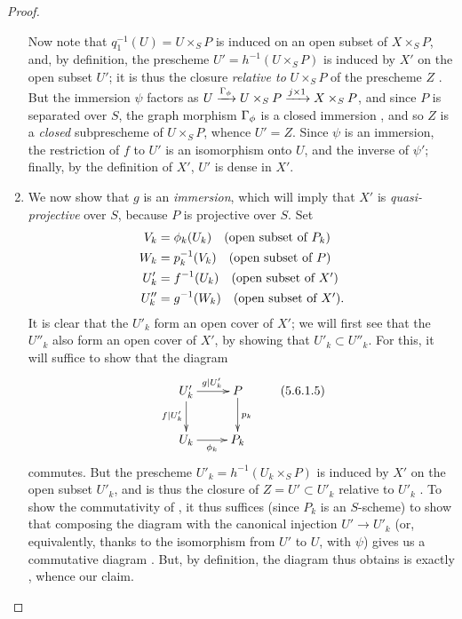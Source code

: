 \begin{proof}
\begin{enumerate}[label=(\Alph*)]
        Now note that $q_1^{-1}(U)=U\times_S P$ is induced on an open subset of $X\times_S P$, and, by definition, the prescheme $U'=h^{-1}(U\times_S P)$ is induced by $X'$ on the open subset $U'$;
        it is thus the closure \emph{relative to}
        $U\times_S P$ of the prescheme $Z$ .
        But the immersion $\psi$ factors as $U\xrightarrow{\Gamma_\phi}U\times_S P\xrightarrow{j\times1}X\times_S P$, and since $P$ is separated over $S$, the graph morphism $\Gamma_\phi$ is a closed immersion , and so $Z$ is a \emph{closed} subprescheme of $U\times_S P$, whence $U'=Z$.
        Since $\psi$ is an immersion, the restriction of $f$ to $U'$ is an isomorphism onto $U$, and the inverse of $\psi'$;
        finally, by the definition of $X'$, $U'$ is dense in $X'$.
    \item We now show that $g$ is an \emph{immersion}, which will imply that $X'$ is \emph{quasi-projective} over $S$, because $P$ is projective over $S$.
        Set
        \begin{align*}
            V_k &= \phi_k(U_k) \quad \mbox{(open subset of $P_k$)}\\
            W_k &= p_k^{-1}(V_k) \quad \mbox{(open subset of $P$)}\\
            U'_k &= f^{-1}(U_k) \quad \mbox{(open subset of $X'$)}\\
            U''_k &= g^{-1}(W_k) \quad \mbox{(open subset of $X'$)}.
        \end{align*}
        It is clear that the $U'_k$ form an open cover of $X'$;
        we will first see that the $U''_k$ also form an open cover of $X'$, by showing that $U'_k\subset U''_k$.
        For this, it will suffice to show that the diagram
        \begin{equation*}
        \label{2.5.6.1.5}
            \xymatrix{
                U'_k \ar[r]^{g|U'_k} \ar[d]_{f|U'_k}
                & P \ar[d]^{p_k}\\
                U_k \ar[r]_{\vphi_k}
                & P_k
            }\tag{5.6.1.5}
        \end{equation*}
        commutes.
        But the prescheme $U'_k=h^{-1}(U_k\times_S P)$ is induced by $X'$ on the open subset $U'_k$, and is thus the closure of $Z=U'\subset U'_k$ relative to $U'_k$ .
        To show the commutativity of , it thus suffices (since $P_k$ is an $S$-scheme) to show that composing the diagram with the canonical injection $U'\to U'_k$ (or, equivalently, thanks to the isomorphism from $U'$ to $U$, with $\psi$) gives us a commutative diagram .
        But, by definition, the diagram thus obtains is exactly , whence our claim.


\end{enumerate}
\end{proof}
